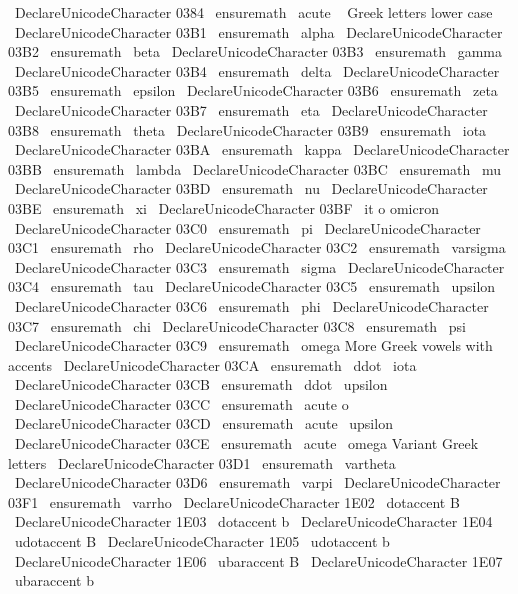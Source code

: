 {{{{{\
DeclareUnicodeCharacter
{
0384
}
{
\
ensuremath
{
\
acute
{
\
}
}
}
%
%
%
Greek
letters
lower
case
\
DeclareUnicodeCharacter
{
03B1
}
{
\
ensuremath
\
alpha
}
%
\
DeclareUnicodeCharacter
{
03B2
}
{
\
ensuremath
\
beta
}
%
\
DeclareUnicodeCharacter
{
03B3
}
{
\
ensuremath
\
gamma
}
%
\
DeclareUnicodeCharacter
{
03B4
}
{
\
ensuremath
\
delta
}
%
\
DeclareUnicodeCharacter
{
03B5
}
{
\
ensuremath
\
epsilon
}
%
\
DeclareUnicodeCharacter
{
03B6
}
{
\
ensuremath
\
zeta
}
%
\
DeclareUnicodeCharacter
{
03B7
}
{
\
ensuremath
\
eta
}
%
\
DeclareUnicodeCharacter
{
03B8
}
{
\
ensuremath
\
theta
}
%
\
DeclareUnicodeCharacter
{
03B9
}
{
\
ensuremath
\
iota
}
%
\
DeclareUnicodeCharacter
{
03BA
}
{
\
ensuremath
\
kappa
}
%
\
DeclareUnicodeCharacter
{
03BB
}
{
\
ensuremath
\
lambda
}
%
\
DeclareUnicodeCharacter
{
03BC
}
{
\
ensuremath
\
mu
}
%
\
DeclareUnicodeCharacter
{
03BD
}
{
\
ensuremath
\
nu
}
%
\
DeclareUnicodeCharacter
{
03BE
}
{
\
ensuremath
\
xi
}
%
\
DeclareUnicodeCharacter
{
03BF
}
{
{
\
it
o
}
}
%
omicron
\
DeclareUnicodeCharacter
{
03C0
}
{
\
ensuremath
\
pi
}
%
\
DeclareUnicodeCharacter
{
03C1
}
{
\
ensuremath
\
rho
}
%
\
DeclareUnicodeCharacter
{
03C2
}
{
\
ensuremath
\
varsigma
}
%
\
DeclareUnicodeCharacter
{
03C3
}
{
\
ensuremath
\
sigma
}
%
\
DeclareUnicodeCharacter
{
03C4
}
{
\
ensuremath
\
tau
}
%
\
DeclareUnicodeCharacter
{
03C5
}
{
\
ensuremath
\
upsilon
}
%
\
DeclareUnicodeCharacter
{
03C6
}
{
\
ensuremath
\
phi
}
%
\
DeclareUnicodeCharacter
{
03C7
}
{
\
ensuremath
\
chi
}
%
\
DeclareUnicodeCharacter
{
03C8
}
{
\
ensuremath
\
psi
}
%
\
DeclareUnicodeCharacter
{
03C9
}
{
\
ensuremath
\
omega
}
%
%
%
More
Greek
vowels
with
accents
\
DeclareUnicodeCharacter
{
03CA
}
{
\
ensuremath
{
\
ddot
\
iota
}
}
%
\
DeclareUnicodeCharacter
{
03CB
}
{
\
ensuremath
{
\
ddot
\
upsilon
}
}
%
\
DeclareUnicodeCharacter
{
03CC
}
{
\
ensuremath
{
\
acute
o
}
}
%
\
DeclareUnicodeCharacter
{
03CD
}
{
\
ensuremath
{
\
acute
\
upsilon
}
}
%
\
DeclareUnicodeCharacter
{
03CE
}
{
\
ensuremath
{
\
acute
\
omega
}
}
%
%
%
Variant
Greek
letters
\
DeclareUnicodeCharacter
{
03D1
}
{
\
ensuremath
\
vartheta
}
%
\
DeclareUnicodeCharacter
{
03D6
}
{
\
ensuremath
\
varpi
}
%
\
DeclareUnicodeCharacter
{
03F1
}
{
\
ensuremath
\
varrho
}
%
%
\
DeclareUnicodeCharacter
{
1E02
}
{
\
dotaccent
{
B
}
}
%
\
DeclareUnicodeCharacter
{
1E03
}
{
\
dotaccent
{
b
}
}
%
\
DeclareUnicodeCharacter
{
1E04
}
{
\
udotaccent
{
B
}
}
%
\
DeclareUnicodeCharacter
{
1E05
}
{
\
udotaccent
{
b
}
}
%
\
DeclareUnicodeCharacter
{
1E06
}
{
\
ubaraccent
{
B
}
}
%
\
DeclareUnicodeCharacter
{
1E07
}
{
\
ubaraccent
{
b
}}}}}}}
